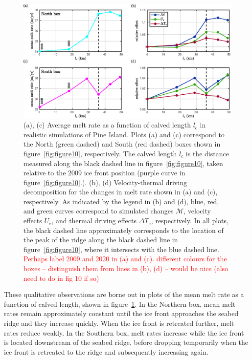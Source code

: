 \documentclass[draft]{agujournal2019}
\newcommand{\red}[1]{\textcolor{red}{#1}}
\begin{document}
\begin{figure}
    \centering
    \includegraphics[width = \textwidth]{../make_figures/plots/figure12.eps}
    \caption{(a), (c) Average melt rate as a function of calved length $l_c$ in realistic simulations of Pine Island. Plots (a) and (c) correspond to the North (green dashed) and South (red dashed) boxes shown in figure~\ref{fig:figure10}, respectively. The calved length $l_c$ is the distance measured along the black dashed line in figure~\ref{fig:figure10}, taken relative to the 2009 ice front position (purple curve in figure~\ref{fig:figure10}.). (b), (d) Velocity-thermal driving decomposition for the changes in melt rate shown in (a) and (c), respectively. As indicated by the legend in (b) and (d), blue, red, and green curves correspond to simulated changes $\mathcal{M}$, velocity effects $U_e$, and thermal driving effects $\Delta T_e$, respectively. In all plots, the black dashed line approximately corresponds to the location of the peak of the ridge along the black dashed line in figure~\ref{fig:figure10}, where it intersects with the blue dashed line. \red{Perhaps label 2009 and 2020 in (a) and (c). different colours for the boxes -- distinguish them from lines in (b), (d) -- would be nice (also need to do in fig 10 if so)}}\label{fig:figure12}
\end{figure}

These qualitative observations are borne out in plots of the mean melt rate as a function of calved length, shown in figure~\ref{fig:figure12}. In the Northern box, mean melt rates remain approximately constant until the ice front approaches the seabed ridge and they increase quickly. When the ice front is retreated further, melt rates reduce weakly. In the Southern box, melt rates increase while the ice front is located downstream of the seabed ridge, before dropping temporarily when the ice front is retreated to the ridge and subsequently increasing again. 
\end{document}
